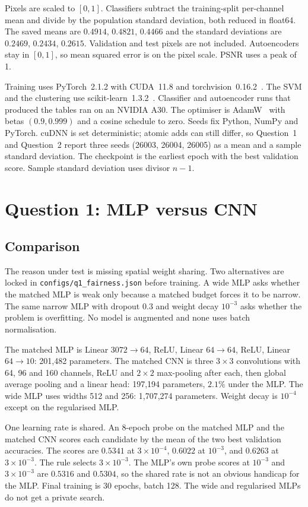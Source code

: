 \documentclass[10pt,twocolumn,letterpaper]{article}
\begin{document}
Pixels are scaled to $[0,1]$. Classifiers subtract the training-split per-channel mean and divide by the population standard deviation, both reduced in float64. The saved means are $0.4914$, $0.4821$, $0.4466$ and the standard deviations are $0.2469$, $0.2434$, $0.2615$. Validation and test pixels are not included. Autoencoders stay in $[0,1]$, so mean squared error is on the pixel scale. PSNR uses a peak of 1.

Training uses PyTorch~2.1.2 with CUDA~11.8 and torchvision~0.16.2~\cite{paszke2019pytorch}. The SVM and the clustering use scikit-learn~1.3.2~\cite{pedregosa2011sklearn}. Classifier and autoencoder runs that produced the tables ran on an NVIDIA A30. The optimiser is AdamW~\cite{kingma2015adam,loshchilov2019adamw} with betas $(0.9, 0.999)$ and a cosine schedule to zero. Seeds fix Python, NumPy and PyTorch. cuDNN is set deterministic; atomic adds can still differ, so Question~1 and Question~2 report three seeds (26003, 26004, 26005) as a mean and a sample standard deviation. The checkpoint is the earliest epoch with the best validation score. Sample standard deviation uses divisor $n-1$.

\section{Question 1: MLP versus CNN}
\subsection{Comparison}
The reason under test is missing spatial weight sharing. Two alternatives are locked in \texttt{configs/q1\_fairness.json} before training. A wide MLP asks whether the matched MLP is weak only because a matched budget forces it to be narrow. The same narrow MLP with dropout $0.3$ and weight decay $10^{-3}$ asks whether the problem is overfitting. No model is augmented and none uses batch normalisation.

The matched MLP is Linear $3072{\to}64$, ReLU, Linear $64{\to}64$, ReLU, Linear $64{\to}10$: 201{,}482 parameters. The matched CNN is three $3{\times}3$ convolutions with 64, 96 and 160 channels, ReLU and $2{\times}2$ max-pooling after each, then global average pooling and a linear head: 197{,}194 parameters, $2.1\%$ under the MLP. The wide MLP uses widths 512 and 256: 1{,}707{,}274 parameters. Weight decay is $10^{-4}$ except on the regularised MLP.

One learning rate is shared. An 8-epoch probe on the matched MLP and the matched CNN scores each candidate by the mean of the two best validation accuracies. The scores are $0.5341$ at $3{\times}10^{-4}$, $0.6022$ at $10^{-3}$, and $0.6263$ at $3{\times}10^{-3}$. The rule selects $3{\times}10^{-3}$. The MLP's own probe scores at $10^{-3}$ and $3{\times}10^{-3}$ are $0.5316$ and $0.5304$, so the shared rate is not an obvious handicap for the MLP. Final training is 30 epochs, batch 128. The wide and regularised MLPs do not get a private search.
\end{document}
